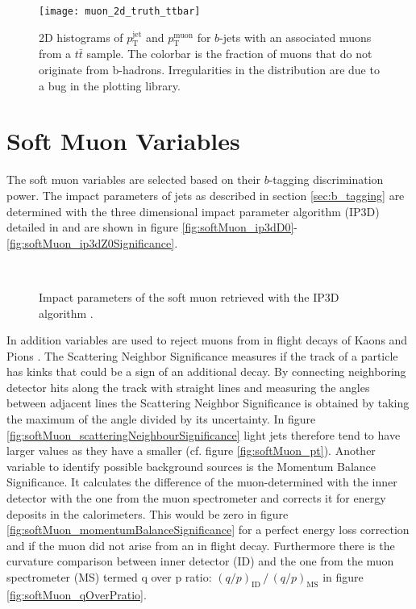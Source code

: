 \begin{figure}[]
  \texttt{[image: muon\_2d\_truth\_ttbar]}
  \caption{2D histograms of $p_\mathrm{T}^\mathrm{jet}$ and $p_\mathrm{T}^\mathrm{muon}$ for $b$-jets with an associated muons from a $t\bar{t}$ sample. The colorbar is the fraction of muons that do not originate from b-hadrons. Irregularities in the distribution are due to a bug in the plotting library.}
  \label{fig:muon_2d_truth}
\end{figure}



\section{Soft Muon Variables}
\label{sec:SoftMuonVariables}
The soft muon variables are selected based on their $b$-tagging discrimination power. The impact parameters of jets as described in section \ref{sec:b_tagging} are determined with the three dimensional impact parameter algorithm (IP3D) detailed in \citep{ATL-PHYS-PUB-2017-013} and are shown in figure \ref{fig:softMuon_ip3dD0}-\ref{fig:softMuon_ip3dZ0Significance}.
\begin{figure}[]
  \centering
  \\
  \caption{Impact parameters of the soft muon retrieved with the IP3D algorithm \citep{ATL-PHYS-PUB-2017-013}.}
  \label{fig:softMuonKinematics}
\end{figure}
In addition variables are used to reject muons from in flight decays of Kaons and Pions \citep{ATLAS-CONF-2020-030}. The Scattering Neighbor Significance measures if the track of a particle has kinks that could be a sign of an additional decay. By connecting neighboring detector hits along the track with straight lines and measuring the angles between adjacent lines the Scattering Neighbor Significance is obtained by taking the maximum of the angle divided by its uncertainty. In figure \ref{fig:softMuon_scatteringNeighbourSignificance} light jets therefore tend to have larger values as they have a smaller \pt (cf. figure \ref{fig:softMuon_pt}). Another variable to identify possible background sources is the Momentum Balance Significance. It calculates the difference of the muon-\pt determined with the inner detector with the one from the muon spectrometer and corrects it for energy deposits in the calorimeters. This would be zero in figure \ref{fig:softMuon_momentumBalanceSignificance} for a perfect energy loss correction and if the muon did not arise from an in flight decay. Furthermore there is the curvature comparison between inner detector (ID) and the one from the muon spectrometer (MS) termed q over p ratio: $(q/p)_\mathrm{ID}\, \bm{/}\, (q/p)_\mathrm{MS}$ in figure \ref{fig:softMuon_qOverPratio}.

